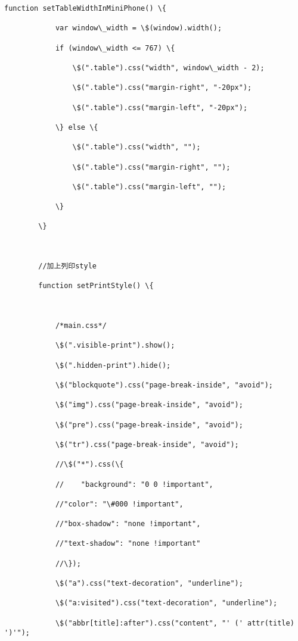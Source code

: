 \documentclass[11pt]{article}
\begin{document}
\begin{Verbatim}[commandchars=\\\{\}]
        function setTableWidthInMiniPhone() \{

            var window\_width = \$(window).width();

            if (window\_width <= 767) \{

                \$(".table").css("width", window\_width - 2);

                \$(".table").css("margin-right", "-20px");

                \$(".table").css("margin-left", "-20px");

            \} else \{

                \$(".table").css("width", "");

                \$(".table").css("margin-right", "");

                \$(".table").css("margin-left", "");

            \}

        \}



        //加上列印style

        function setPrintStyle() \{



            /*main.css*/

            \$(".visible-print").show();

            \$(".hidden-print").hide();

            \$("blockquote").css("page-break-inside", "avoid");

            \$("img").css("page-break-inside", "avoid");

            \$("pre").css("page-break-inside", "avoid");

            \$("tr").css("page-break-inside", "avoid");

            //\$("*").css(\{

            //    "background": "0 0 !important",

            //"color": "\#000 !important",

            //"box-shadow": "none !important",

            //"text-shadow": "none !important"

            //\});

            \$("a").css("text-decoration", "underline");

            \$("a:visited").css("text-decoration", "underline");

            \$("abbr[title]:after").css("content", "' (' attr(title) ')'");


\end{Verbatim}
\end{document}
